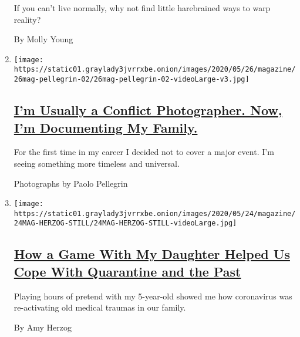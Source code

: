 \begin{enumerate}
  If you can't live normally, why not find little harebrained ways to
  warp reality?

  By Molly Young
\item
  \texttt{[image: https://static01.graylady3jvrrxbe.onion/images/2020/05/26/magazine/26mag-pellegrin-02/26mag-pellegrin-02-videoLarge-v3.jpg]}

  \hypertarget{im-usually-a-conflict-photographer-now-im-documenting-my-family}{%
  \subsection{\texorpdfstring{\href{/interactive/2020/05/16/magazine/covid-quarantine-family.html}{I'm
  Usually a Conflict Photographer. Now, I'm Documenting My
  Family.}}{I'm Usually a Conflict Photographer. Now, I'm Documenting My Family.}}\label{im-usually-a-conflict-photographer-now-im-documenting-my-family}}

  For the first time in my career I decided not to cover a major event.
  I'm seeing something more timeless and universal.

  Photographs by Paolo Pellegrin
\item
  \texttt{[image: https://static01.graylady3jvrrxbe.onion/images/2020/05/24/magazine/24MAG-HERZOG-STILL/24MAG-HERZOG-STILL-videoLarge.jpg]}

  \hypertarget{how-a-game-with-my-daughter-helped-us-cope-with-quarantine-and-the-past}{%
  \subsection{\texorpdfstring{\href{/interactive/2020/05/20/magazine/covid-quarantine-child.html}{How
  a Game With My Daughter Helped Us Cope With Quarantine and the
  Past}}{How a Game With My Daughter Helped Us Cope With Quarantine and the Past}}\label{how-a-game-with-my-daughter-helped-us-cope-with-quarantine-and-the-past}}

  Playing hours of pretend with my 5-year-old showed me how coronavirus
  was re-activating old medical traumas in our family.

  By Amy Herzog
\end{enumerate}

